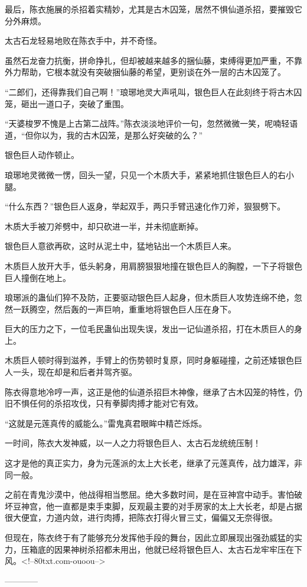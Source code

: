 \begin{this_body}
最后，陈衣施展的杀招着实精妙，尤其是古木囚笼，居然不惧仙道杀招，要摧毁它分外麻烦。

太古石龙轻易地败在陈衣手中，并不奇怪。

虽然石龙奋力抗衡，拼命挣扎，但却被越来越多的捆仙藤，束缚得更加严重，不靠外力帮助，它根本就没有突破捆仙藤的希望，更别谈在外一层的古木囚笼了。

“二郎们，还得靠我们自己啊！”琅琊地灵大声吼叫，银色巨人在此刻终于将古木囚笼，砸出一道口子，突破了重围。

“天婆梭罗不愧是上古第二战阵。”陈衣淡淡地评价一句，忽然微微一笑，呢喃轻语道，“但你以为，我的古木囚笼，是那么好突破的么？”

银色巨人动作顿止。

琅琊地灵微微一愣，回头一望，只见一个木质大手，紧紧地抓住银色巨人的右小腿。

“什么东西？”银色巨人返身，举起双手，两只手臂迅速化作刀斧，狠狠劈下。

木质大手被刀斧劈中，却只砍进一半，并未彻底断掉。

银色巨人意欲再砍，这时从泥土中，猛地钻出一个木质巨人来。

木质巨人放开大手，低头躬身，用肩膀狠狠地撞在银色巨人的胸膛，一下子将银色巨人撞倒在地上。

琅琊派的蛊仙们猝不及防，正要驱动银色巨人起身，但木质巨人攻势连绵不绝，忽然一跃腾空，然后轰的一声巨响，重重地将银色巨人压在身下。

巨大的压力之下，一位毛民蛊仙出现失误，发出一记仙道杀招，打在木质巨人的身上。

木质巨人顿时得到滋养，手臂上的伤势顿时复原，同时身躯碰撞，之前还矮银色巨人一头，现在却是和后者并驾齐驱。

陈衣得意地冷哼一声，这正是他的仙道杀招巨木神像，继承了古木囚笼的特性，仍旧不惧任何的杀招攻伐，只有拳脚肉搏才能对它有效。

“这就是元莲真传的威能么。”雷鬼真君眼眸中精芒烁烁。

一时间，陈衣大发神威，以一人之力将银色巨人、太古石龙统统压制！

这才是他的真正实力，身为元莲派的太上大长老，继承了元莲真传，战力雄浑，非同一般。

之前在青鬼沙漠中，他战得相当憋屈。绝大多数时间，是在豆神宫中动手。害怕破坏豆神宫，他一直都是束手束脚，反观最主要的对手房家的太上大长老，却是占据很大便宜，力道内敛，进行肉搏，把陈衣打得火冒三丈，偏偏又无奈得很。

但现在，陈衣终于有了能够充分发挥他手段的舞台，因此立即展现出强劲威猛的实力，压箱底的因果神树杀招都未用出，他就已经将银色巨人、太古石龙牢牢压在下风。<!--80txt.com-ouoou-->

------------

\end{this_body}

